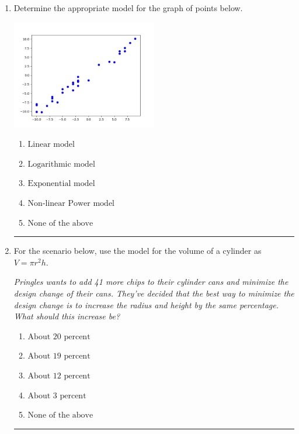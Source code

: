 \documentclass[14pt]{extbook}
\newcommand{\litem}[1]{\item#1\hspace*{-1cm}\rule{\textwidth}{0.4pt}}
\begin{document}
\begin{enumerate}
{\begin{enumerate}[label=\Alph*.]
\end{enumerate} }
\litem{
Determine the appropriate model for the graph of points below.
\begin{center}
    \includegraphics[width=0.5\textwidth]{../Figures/identifyModelGraph12C.png}
\end{center}
\begin{enumerate}[label=\Alph*.]
\item \( \text{Linear model} \)
\item \( \text{Logarithmic model} \)
\item \( \text{Exponential model} \)
\item \( \text{Non-linear Power model} \)
\item \( \text{None of the above} \)

\end{enumerate} }
\litem{
For the scenario below, use the model for the volume of a cylinder as $V = \pi r^2 h$.
\begin{center}
    \textit{ Pringles wants to add 41 \text{percent} more chips to their cylinder cans and minimize the design change of their cans. They've decided that the best way to minimize the design change is to increase the radius and height by the same percentage. What should this increase be? }
\end{center}
\begin{enumerate}[label=\Alph*.]
\item \( \text{About } 20 \text{ percent} \)
\item \( \text{About } 19 \text{ percent} \)
\item \( \text{About } 12 \text{ percent} \)
\item \( \text{About } 3 \text{ percent} \)
\item \( \text{None of the above} \)


\end{enumerate}}
\end{enumerate}
\end{document}
